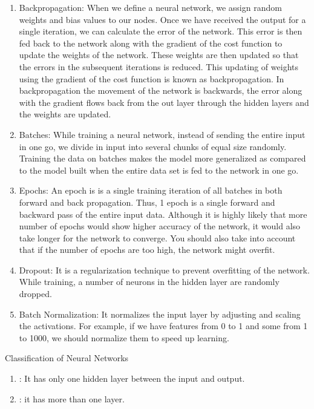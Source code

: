 \documentclass[letterpaper,10pt,english]{jupyterBook}
\begin{document}
\begin{enumerate}
\item {} 
\sphinxAtStartPar
Backpropagation: When we define a neural network, we assign random
weights and bias values to our nodes. Once we have received the output
for a single iteration, we can calculate the error of the network. This
error is then fed back to the network along with the gradient of the
cost function to update the weights of the network. These weights are
then updated so that the errors in the subsequent iterations is reduced.
This updating of weights using the gradient of the cost function is
known as back\sphinxhyphen{}propagation. In back\sphinxhyphen{}propagation the movement of the
network is backwards, the error along with the gradient flows back from
the out layer through the hidden layers and the weights are updated.

\item {} 
\sphinxAtStartPar
Batches: While training a neural network, instead of sending the
entire input in one go, we divide in input into several chunks of equal
size randomly. Training the data on batches makes the model more
generalized as compared to the model built when the entire data set is
fed to the network in one go.

\item {} 
\sphinxAtStartPar
Epochs: An epoch is is a single training iteration of all batches
in both forward and back propagation. Thus, 1 epoch is a single forward
and backward pass of the entire input data. Although it is highly likely
that more number of epochs would show higher accuracy of the network, it
would also take longer for the network to converge. You should also take
into account that if the number of epochs are too high, the network
might over\sphinxhyphen{}fit.

\item {} 
\sphinxAtStartPar
Dropout: It is a regularization technique to prevent over\sphinxhyphen{}fitting
of the network. While training, a number of neurons in the hidden layer
are randomly dropped.

\item {} 
\sphinxAtStartPar
Batch Normalization: It normalizes the input layer by adjusting and
scaling the activations. For example, if we have features from 0 to 1
and some from 1 to 1000, we should normalize them to speed up learning.

\end{enumerate}

\sphinxAtStartPar
Classification of Neural Networks
\begin{enumerate}
%
\item {} 
\sphinxAtStartPar
{}: It has only one hidden layer between the
input and output.

\item {} 
\sphinxAtStartPar
{}: it has more than one layer.

\end{enumerate}
\end{document}
